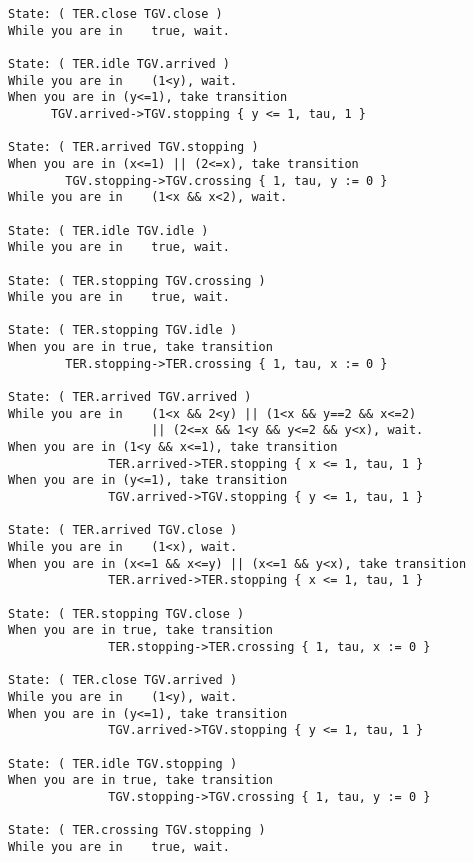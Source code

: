 \documentclass{article}
\begin{document}
\begin{verbatim}
State: ( TER.close TGV.close ) 
While you are in	true, wait.

State: ( TER.idle TGV.arrived ) 
While you are in	(1<y), wait.
When you are in (y<=1), take transition 
      TGV.arrived->TGV.stopping { y <= 1, tau, 1 }

State: ( TER.arrived TGV.stopping ) 
When you are in (x<=1) || (2<=x), take transition 
        TGV.stopping->TGV.crossing { 1, tau, y := 0 }
While you are in	(1<x && x<2), wait.

State: ( TER.idle TGV.idle ) 
While you are in	true, wait.

State: ( TER.stopping TGV.crossing ) 
While you are in	true, wait.

State: ( TER.stopping TGV.idle ) 
When you are in true, take transition 
        TER.stopping->TER.crossing { 1, tau, x := 0 }

State: ( TER.arrived TGV.arrived ) 
While you are in	(1<x && 2<y) || (1<x && y==2 && x<=2) 
                    || (2<=x && 1<y && y<=2 && y<x), wait.
When you are in (1<y && x<=1), take transition 
              TER.arrived->TER.stopping { x <= 1, tau, 1 }
When you are in (y<=1), take transition 
              TGV.arrived->TGV.stopping { y <= 1, tau, 1 }

State: ( TER.arrived TGV.close ) 
While you are in	(1<x), wait.
When you are in (x<=1 && x<=y) || (x<=1 && y<x), take transition 
              TER.arrived->TER.stopping { x <= 1, tau, 1 }

State: ( TER.stopping TGV.close ) 
When you are in true, take transition 
              TER.stopping->TER.crossing { 1, tau, x := 0 }

State: ( TER.close TGV.arrived ) 
While you are in	(1<y), wait.
When you are in (y<=1), take transition 
              TGV.arrived->TGV.stopping { y <= 1, tau, 1 }

State: ( TER.idle TGV.stopping ) 
When you are in true, take transition 
              TGV.stopping->TGV.crossing { 1, tau, y := 0 }

State: ( TER.crossing TGV.stopping ) 
While you are in	true, wait.

\end{verbatim}
\end{document}
